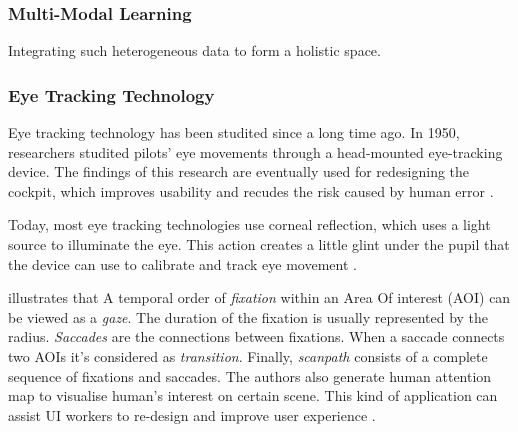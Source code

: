 \subsubsection{Multi-Modal Learning}





Integrating such heterogeneous data to form a holistic space.

\subsubsection{Eye Tracking Technology}


Eye tracking technology has been studited since a long time ago. In 1950, researchers studited pilots' eye movements through a head-mounted eye-tracking device. The findings of this research are eventually used for redesigning the cockpit, which improves usability and recudes the risk caused by human error \citep{Fitts2005Cockpit, Cooke2005EyeTrackingUsability}.

Today, most eye tracking technologies use corneal reflection, which uses a light source to illuminate the eye. This action creates a little glint under the pupil that the device can use to calibrate and track eye movement \citep{Schall2014EyeTrackingIntro, Fitts2005Cockpit}.

\citet{Blascheck2014VisualisingEyeTracking} illustrates that A temporal order of \textit{fixation} within an Area Of interest (AOI) can be viewed as a \textit{gaze}. The duration of the fixation is usually represented by the radius. \textit{Saccades} are the connections between fixations. When a saccade connects two AOIs it's considered as  \textit{transition}. Finally, \textit{scanpath} consists of a complete sequence of fixations and saccades. The authors also generate human attention map to visualise human's interest on certain scene. This kind of application can assist UI workers to re-design and improve user experience \citep{Schall2014EyeTrackingIntro}.

